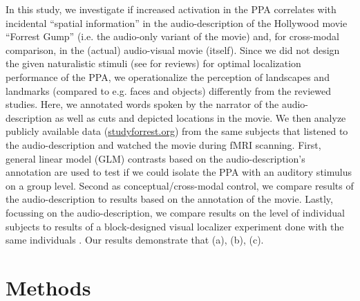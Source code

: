 \documentclass[english]{article}
\begin{document}
In this study, we investigate if increased activation in the PPA correlates with
incidental ``spatial information'' in the audio-description of the Hollywood
movie ``Forrest Gump'' (i.e. the audio-only variant of the movie) and, for
cross-modal comparison, in the (actual) audio-visual movie (itself).
Since we did not design the given naturalistic stimuli (see
\citep{hamilton2018revolution, hasson2008neurocinematics,
sonkusare2019naturalistic} for reviews) for optimal localization performance of
the PPA, we operationalize the perception of landscapes and landmarks (compared
to e.g. faces and objects) differently from the reviewed studies.
Here, we annotated words spoken by the narrator of the audio-description as well
as cuts and depicted locations in the movie.
We then analyze publicly available data
(\href{http://www.studyforrest.org}{studyforrest.org}) from the same subjects
that listened to the audio-description and watched the movie during fMRI
scanning.
First, general linear model (GLM) contrasts based on the audio-description's
annotation are used to test if we could isolate the PPA with an auditory
stimulus on a group level.
Second as conceptual/cross-modal control, we compare results of the
audio-description to results based on the annotation of the movie.
Lastly, focussing on the audio-description, we compare results on the level of
individual subjects to results of a block-designed visual localizer experiment
done with the same individuals \citep{sengupta2016extension}.
Our results demonstrate that (a), (b), (c).



\section{Methods}

\end{document}
